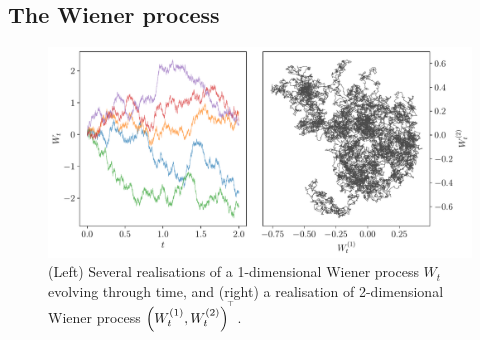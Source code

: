 \subsection{The Wiener process}

\begin{figure}
	\begin{center}
		\includegraphics[width=\textwidth]{chp02_background/figures/wiener_realisations}
		\caption{(Left) Several realisations of a 1-dimensional Wiener process \(W_t\) evolving through time, and (right) a realisation of 2-dimensional Wiener process \(\left(W_t^{(1)}, W_t^{(2)}\right)^{^{\!\top}}\).}
		\label{fig:wiener_rels}
	\end{center}
\end{figure}

